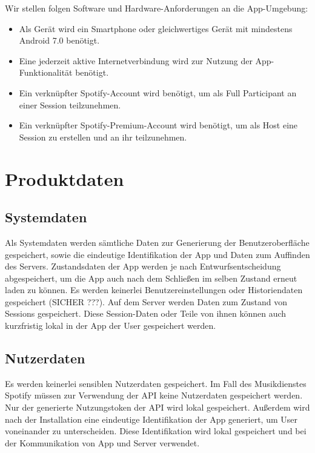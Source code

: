 \documentclass[oneside, ngerman]{sdqtechreport}
\begin{document}
Wir stellen folgen Software und Hardware-Anforderungen an die App-Umgebung:

\begin{itemize}
    \item Als Gerät wird ein Smartphone oder gleichwertiges Gerät mit mindestens Android 7.0 benötigt.
    \item Eine jederzeit aktive Internetverbindung wird zur Nutzung der App-Funktionalität benötigt.
    \item Ein verknüpfter Spotify-Account wird benötigt, um als Full Participant an einer Session teilzunehmen.
    \item Ein verknüpfter Spotify-Premium-Account wird benötigt, um als Host eine Session zu erstellen und an ihr teilzunehmen.
\end{itemize}



\chapter{Produktdaten}
\label{chap:Produktdaten}

\section{Systemdaten}
\label{sec:Produktdaten:Systemdaten}

Als Systemdaten werden sämtliche Daten zur Generierung der Benutzeroberfläche gespeichert, sowie die eindeutige Identifikation der App und Daten zum Auffinden des Servers. Zustandsdaten der App werden je nach Entwurfsentscheidung abgespeichert, um die App auch nach dem Schließen im selben Zustand erneut laden zu können. Es werden keinerlei Benutzereinstellungen oder Historiendaten gespeichert (SICHER ???). Auf dem Server werden Daten zum Zustand von Sessions gespeichert. Diese Session-Daten oder Teile von ihnen können auch kurzfristig lokal in der App der User gespeichert werden.

\section{Nutzerdaten}
\label{sec:Produktdaten:Nutzerdaten}

Es werden keinerlei sensiblen Nutzerdaten gespeichert. Im Fall des Musikdienstes Spotify müssen zur Verwendung der API keine Nutzerdaten gespeichert werden. Nur der generierte Nutzungstoken der API wird lokal gespeichert. Außerdem wird nach der Installation eine eindeutige Identifikation der App generiert, um User voneinander zu unterscheiden. Diese Identifikation wird lokal gespeichert und bei der Kommunikation von App und Server verwendet.
\end{document}
